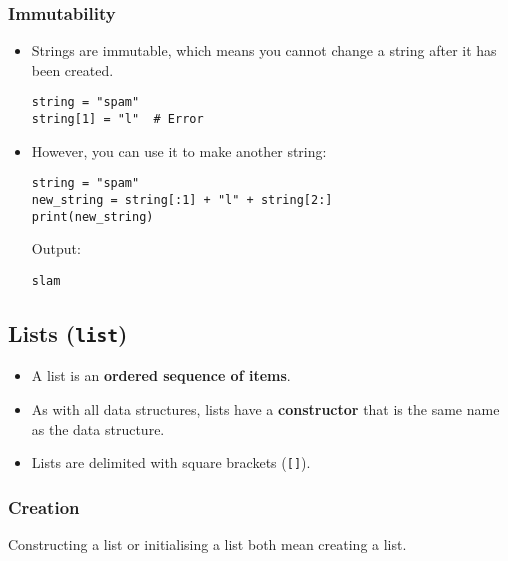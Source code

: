 \documentclass[11pt]{article}
\begin{document}
\subsubsection{Immutability}
\label{sec:orgc896f77}
\begin{itemize}
\item Strings are immutable, which means you cannot change a string after it has been created.
\begin{verbatim}
string = "spam"
string[1] = "l"  # Error
\end{verbatim}

\item However, you can use it to make another string:
\begin{verbatim}
string = "spam"
new_string = string[:1] + "l" + string[2:]
print(new_string)
\end{verbatim}

 \noindent Output:

\begin{verbatim}
slam
\end{verbatim}
\end{itemize}

 \newpage

\subsection{Lists (\texttt{list})}
\label{sec:org204ca7d}
\begin{itemize}
\item A list is an \textbf{ordered sequence of items}.
\item As with all data structures, lists have a \textbf{constructor} that is the same name as the data structure.
\item Lists are delimited with square brackets (\texttt{[]}).
\end{itemize}

\subsubsection{Creation}
\label{sec:org81493eb}
Constructing a list or initialising a list both mean creating a list.
\end{document}
